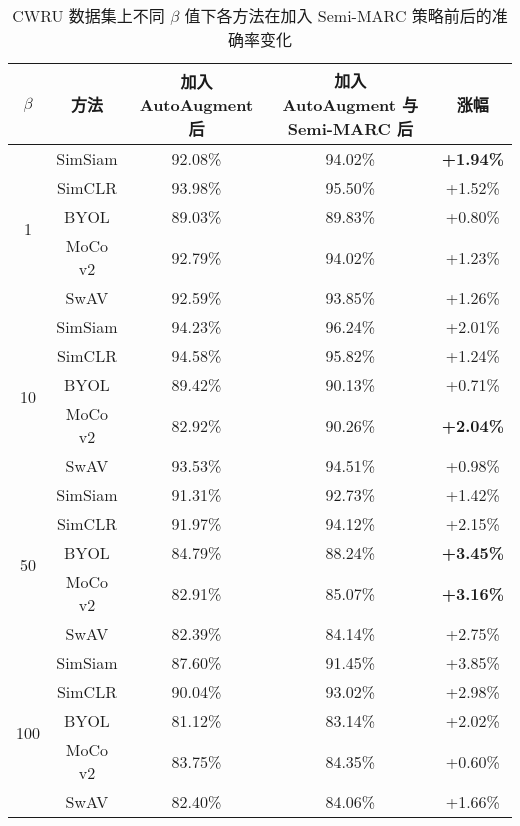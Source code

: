 \documentclass[master]{thesis-uestc}
\begin{document}
\begin{table}[!h]
    \caption{CWRU 数据集上不同 $\beta$ 值下各方法在加入 Semi-MARC 策略前后的准确率变化}
    \centering
    \renewcommand\arraystretch{1.2}
    \begin{tabular}{ccccc}
    \toprule
    $\beta$ & 方法 & 加入 AutoAugment 后 & 加入 AutoAugment 与 Semi-MARC 后 & 涨幅 \\
    \midrule
    \multirow{5}{*}{1}   
        & SimSiam & 92.08\% & 94.02\% & \textbf{+1.94\%} \\
        & SimCLR  & 93.98\% & 95.50\% & +1.52\% \\
        & BYOL    & 89.03\% & 89.83\% & +0.80\% \\
        & MoCo v2 & 92.79\% & 94.02\% & +1.23\% \\
        & SwAV    & 92.59\% & 93.85\% & +1.26\% \\
    \midrule
    \multirow{5}{*}{10}  
        & SimSiam & 94.23\% & 96.24\% & +2.01\% \\
        & SimCLR  & 94.58\% & 95.82\% & +1.24\% \\
        & BYOL    & 89.42\% & 90.13\% & +0.71\% \\
        & MoCo v2 & 82.92\% & 90.26\% & \textbf{+2.04\%} \\
        & SwAV    & 93.53\% & 94.51\% & +0.98\% \\
    \midrule
    \multirow{5}{*}{50}  
        & SimSiam & 91.31\% & 92.73\% & +1.42\% \\
        & SimCLR  & 91.97\% & 94.12\% & +2.15\% \\
        & BYOL    & 84.79\% & 88.24\% & \textbf{+3.45\%} \\
        & MoCo v2 & 82.91\% & 85.07\% & \textbf{+3.16\%} \\
        & SwAV    & 82.39\% & 84.14\% & +2.75\% \\
    \midrule
    \multirow{5}{*}{100} 
        & SimSiam & 87.60\% & 91.45\% & +3.85\% \\
        & SimCLR  & 90.04\% & 93.02\% & +2.98\% \\
        & BYOL    & 81.12\% & 83.14\% & +2.02\% \\
        & MoCo v2 & 83.75\% & 84.35\% & +0.60\% \\
        & SwAV    & 82.40\% & 84.06\% & +1.66\% \\
    \bottomrule
    \end{tabular}
    \label{tab:longtail_semimarc_comparison}
\end{table}
\end{document}
